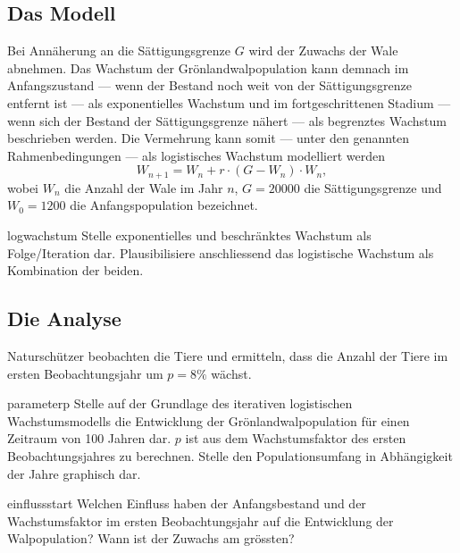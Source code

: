 \documentclass[%
<<<<<<< Updated upstream
<<<<<<< Updated upstream
11pt,%
twoside,%
titlepage,%
german,%
headsepline%
]{scrartcl}
\begin{document}
\subsection{Das Modell}
Bei Annäherung an die Sättigungsgrenze $G$ wird der Zuwachs der Wale abnehmen. Das Wachstum der Grönlandwalpopulation kann demnach im Anfangszustand --- wenn der Bestand noch weit von der Sättigungsgrenze entfernt ist --- als exponentielles Wachstum und im fortgeschrittenen Stadium --- wenn sich der Bestand der Sättigungsgrenze nähert --- als begrenztes Wachstum beschrieben werden. Die Vermehrung kann somit --- unter den genannten Rahmenbedingungen --- als logistisches Wachstum modelliert werden
$$W_{n+1}=W_n+r\cdot (G-W_n)\cdot W_n,$$
wobei $W_n$ die Anzahl der Wale im Jahr $n$, $G=20000$ die Sättigungsgrenze und $W_0=1200$ die Anfangspopulation bezeichnet.

\begin{uebenv}{logwachstum}
Stelle exponentielles und beschränktes Wachstum als Folge/Iteration dar. Plausibilisiere anschliessend das logistische Wachstum als Kombination der beiden.
\end{uebenv}

\subsection{Die Analyse}
Naturschützer beobachten die Tiere und ermitteln, dass die Anzahl der Tiere im ersten Beobachtungsjahr um $p=8\%$ wächst.

\begin{uebenv}{parameterp}
    Stelle auf der Grundlage des iterativen logistischen Wachstumsmodells die Entwicklung der Grönlandwalpopulation für einen Zeitraum von 100 Jahren dar. $p$ ist aus dem Wachstumsfaktor des ersten Beobachtungsjahres zu berechnen. Stelle den Populationsumfang in Abhängigkeit der Jahre graphisch dar.
\end{uebenv}

\begin{uebenv}{einflussstart}
    Welchen Einfluss haben der Anfangsbestand und der Wachstumsfaktor im ersten Beobachtungsjahr auf die Entwicklung der Walpopulation? Wann ist der Zuwachs am grössten?
\end{uebenv}
\end{document}
